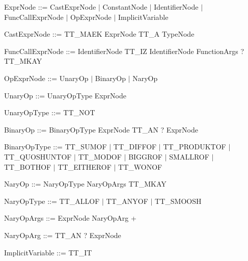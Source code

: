 \begin{DoxyParagraph}{}
Expr\+Node \+:\+:= Cast\+Expr\+Node $\vert$ Constant\+Node $\vert$ Identifier\+Node $\vert$ Func\+Call\+Expr\+Node $\vert$ Op\+Expr\+Node $\vert$ Implicit\+Variable
\end{DoxyParagraph}
\begin{DoxyParagraph}{}
Cast\+Expr\+Node \+:\+:= {\ttfamily T\+T\+\_\+\+M\+A\+EK} Expr\+Node {\ttfamily T\+T\+\_\+A} Type\+Node
\end{DoxyParagraph}
\begin{DoxyParagraph}{}
Func\+Call\+Expr\+Node \+:\+:= Identifier\+Node {\ttfamily T\+T\+\_\+\+IZ} Identifier\+Node Function\+Args ? T\+T\+\_\+\+M\+K\+AY
\end{DoxyParagraph}
\begin{DoxyParagraph}{}
Op\+Expr\+Node \+:\+:= Unary\+Op $\vert$ Binary\+Op $\vert$ Nary\+Op
\end{DoxyParagraph}
\begin{DoxyParagraph}{}
Unary\+Op \+:\+:= Unary\+Op\+Type Expr\+Node
\end{DoxyParagraph}
\begin{DoxyParagraph}{}
Unary\+Op\+Type \+:\+:= {\ttfamily T\+T\+\_\+\+N\+OT} 
\end{DoxyParagraph}
\begin{DoxyParagraph}{}
Binary\+Op \+:\+:= Binary\+Op\+Type Expr\+Node {\ttfamily T\+T\+\_\+\+AN} ? Expr\+Node
\end{DoxyParagraph}
\begin{DoxyParagraph}{}
Binary\+Op\+Type \+:\+:= {\ttfamily T\+T\+\_\+\+S\+U\+M\+OF} $\vert$ {\ttfamily T\+T\+\_\+\+D\+I\+F\+F\+OF} $\vert$ {\ttfamily T\+T\+\_\+\+P\+R\+O\+D\+U\+K\+T\+OF} $\vert$ {\ttfamily T\+T\+\_\+\+Q\+U\+O\+S\+H\+U\+N\+T\+OF} $\vert$ {\ttfamily T\+T\+\_\+\+M\+O\+D\+OF} $\vert$ {\ttfamily B\+I\+G\+G\+R\+OF} $\vert$ {\ttfamily S\+M\+A\+L\+L\+R\+OF} $\vert$ {\ttfamily T\+T\+\_\+\+B\+O\+T\+H\+OF} $\vert$ {\ttfamily T\+T\+\_\+\+E\+I\+T\+H\+E\+R\+OF} $\vert$ {\ttfamily T\+T\+\_\+\+W\+O\+N\+OF} 
\end{DoxyParagraph}
\begin{DoxyParagraph}{}
Nary\+Op \+:\+:= Nary\+Op\+Type Nary\+Op\+Args {\ttfamily T\+T\+\_\+\+M\+K\+AY} 
\end{DoxyParagraph}
\begin{DoxyParagraph}{}
Nary\+Op\+Type \+:\+:= {\ttfamily T\+T\+\_\+\+A\+L\+L\+OF} $\vert$ {\ttfamily T\+T\+\_\+\+A\+N\+Y\+OF} $\vert$ {\ttfamily T\+T\+\_\+\+S\+M\+O\+O\+SH} 
\end{DoxyParagraph}
\begin{DoxyParagraph}{}
Nary\+Op\+Args \+:\+:= Expr\+Node Nary\+Op\+Arg +
\end{DoxyParagraph}
\begin{DoxyParagraph}{}
Nary\+Op\+Arg \+:\+:= {\ttfamily T\+T\+\_\+\+AN} ? Expr\+Node
\end{DoxyParagraph}
\begin{DoxyParagraph}{}
Implicit\+Variable \+:\+:= {\ttfamily T\+T\+\_\+\+IT} 
\end{DoxyParagraph}
